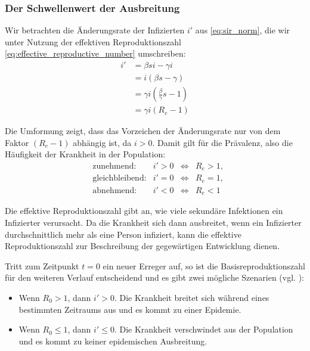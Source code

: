 \documentclass[../main.tex]{subfiles}
\begin{document}
        \subsubsection{Der Schwellenwert der Ausbreitung}
        \label{sssec:threshold}
        Wir betrachten die Änderungsrate der Infizierten $i'$ aus \eqref{eq:sir_norm}, die wir unter Nutzung der effektiven Reproduktionszahl \eqref{eq:effective_reproductive_number} umschreiben:
        \begin{equation*}
            \begin{split}
                i' &= \beta s i - \gamma i \\
                   &= i (\beta s - \gamma) \\
                   &= \gamma i \left( \frac{\beta}{\gamma}s - 1 \right) \\
                   &= \gamma i (R_e - 1)
            \end{split}
        \end{equation*}

        Die Umformung zeigt, dass das Vorzeichen der Änderungsrate nur von dem Faktor $(R_e - 1)$ abhängig ist, da $i>0$. Damit gilt für die Prävalenz, also die Häufigkeit der Krankheit in der Population:
        \begin{equation*}
            \begin{aligned}
                &\text{zunehmend:}      &i' > 0 &\Leftrightarrow &R_e > 1 , \\
                &\text{gleichbleibend:} &i' = 0 &\Leftrightarrow &R_e = 1, \\
                &\text{abnehmend:}      &i' < 0 &\Leftrightarrow &R_e < 1
            \end{aligned}
        \end{equation*}

        Die effektive Reproduktionszahl gibt an, wie viele sekundäre Infektionen ein Infizierter verursacht.
        Da die Krankheit sich dann ausbreitet, wenn ein Infizierter durchschnittlich mehr als eine Person infiziert, kann die effektive Reproduktionszahl zur Beschreibung der gegewärtigen Entwicklung dienen.

        Tritt zum Zeitpunkt $t=0$ ein neuer Erreger auf, so ist die Basisreproduktionszahl für den weiteren Verlauf entscheidend und es gibt zwei mögliche Szenarien (vgl. \cite[S. 4]{Wei13}):
        \begin{itemize}
            \item Wenn $R_0 > 1$, dann $i' > 0$. Die Krankheit breitet sich während eines bestimmten Zeitraums aus und es kommt zu einer Epidemie.
            \item Wenn $R_0 \leq 1$, dann $i' \leq 0$. Die Krankheit verschwindet aus der Population und es kommt zu keiner epidemischen Ausbreitung.
        \end{itemize}
\end{document}
